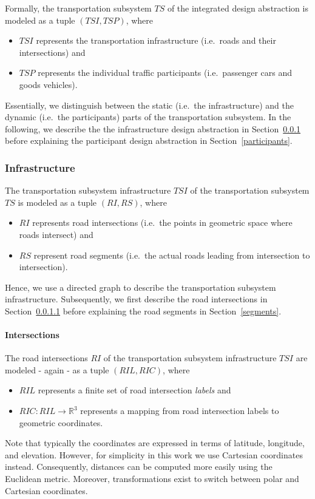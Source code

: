 Formally, the transportation subsystem $TS$ of the integrated design abstraction is modeled as a tuple $(TSI, TSP)$, where
\begin{itemize}
	\item $TSI$ represents the transportation infrastructure (i.e.\ roads and their intersections) and
	\item $TSP$ represents the individual traffic participants (i.e.\ passenger cars and goods vehicles).
\end{itemize}
Essentially, we distinguish between the static (i.e.\ the infrastructure) and the dynamic (i.e.\ the participants) parts of the transportation subsystem. In the following, we describe the the infrastructure design abstraction in Section~\ref{transport_infrastructure} before explaining the participant design abstraction in Section~\ref{participants}.

\subsubsection{Infrastructure}
\label{transport_infrastructure}

The transportation subsystem infrastructure $TSI$ of the transportation subsystem $TS$ is modeled as a tuple $(RI, RS)$, where
\begin{itemize}
	\item $RI$ represents road intersections (i.e.\ the points in geometric space where roads intersect) and
	\item $RS$ represent road segments (i.e.\ the actual roads leading from intersection to intersection).
\end{itemize}
Hence, we use a directed graph to describe the transportation subsystem infrastructure. Subsequently, we first describe the road intersections in Section~\ref{intersections} before explaining the road segments in Section~\ref{segments}.

\paragraph{Intersections}
\label{intersections}

The road intersections $RI$ of the transportation subsystem infrastructure $TSI$ are modeled - again - as a tuple $(RIL, RIC)$, where
\begin{itemize}
	\item $RIL$ represents a finite set of road intersection \textit{labels} and
	\item $RIC: RIL \rightarrow \mathbb{R}^3$ represents a mapping from road intersection labels to geometric coordinates.
\end{itemize}
Note that typically the coordinates are expressed in terms of latitude, longitude, and elevation. However, for simplicity in this work we use Cartesian coordinates instead. Consequently, distances can be computed more easily using the Euclidean metric. Moreover, transformations exist to switch between polar and Cartesian coordinates.

